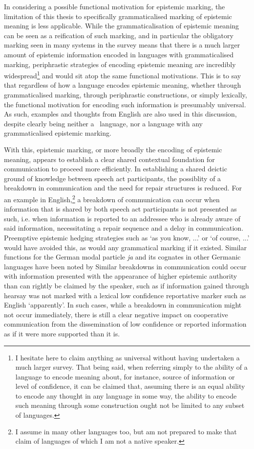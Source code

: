 In considering a possible functional motivation for epistemic marking, the limitation of this thesis to specifically grammaticalised marking of epistemic meaning is less applicable. While the grammaticalisation of epistemic meaning can be seen as a reification of such marking, and in particular the obligatory marking seen in many systems in the survey means that there is a much larger amount of epistemic information encoded in languages with grammaticalised marking, periphrastic strategies of encoding epistemic meaning are incredibly widespread\footnote{I hesitate here to claim anything as universal without having undertaken a much larger survey. That being said, when referring simply to the ability of a language to encode meaning about, for instance, source of information or level of confidence, it can be claimed that, assuming there is an equal ability to encode any thought in any language in some way, the ability to encode such meaning through some construction ought not be limited to any subset of languages.} and would sit atop the same functional motivations. This is to say that regardless of how a language encodes epistemic meaning, whether through grammaticalised marking, through periphrastic constructions, or simply lexically, the functional motivation for encoding such information is presumably universal. As such, examples and thoughts from English are also used in this discussion, despite clearly being neither a \lfam\ language, nor a language with any grammaticalised epistemic marking.

With this, epistemic marking, or more broadly the encoding of epistemic meaning, appears to establish a clear shared contextual foundation for communication to proceed more efficiently. In establishing a shared deictic ground of knowledge between speech act participants, the possiblity of a breakdown in communication and the need for repair structures is reduced. For an example in English,\footnote{I assume in many other languages too, but am not prepared to make that claim of languages of which I am not a native speaker.} a breakdown of communication can occur when information that is shared by both speech act participants is not presented as such, i.e. when information is reported to an addressee who is already aware of said information, necessitating a repair sequence and a delay in communication. Preemptive epistemic hedging strategies such as `as you know, ...' or `of course, ...' would have avoided this, as would any grammatical marking if it existed. Similar functions for the German modal particle \textit{ja} and its cognates in other Germanic languages have been noted by  Similar breakdowns in communication could occur with information presented with the appearance of higher epistemic authority than can rightly be claimed by the speaker, such as if information gained through hearsay was not marked with a lexical low confidence reportative marker such as English `apparently'. In such cases, while a breakdown in communication might not occur immediately, there is still a clear negative impact on cooperative communication from the dissemination of low confidence or reported information as if it were more supported than it is.

